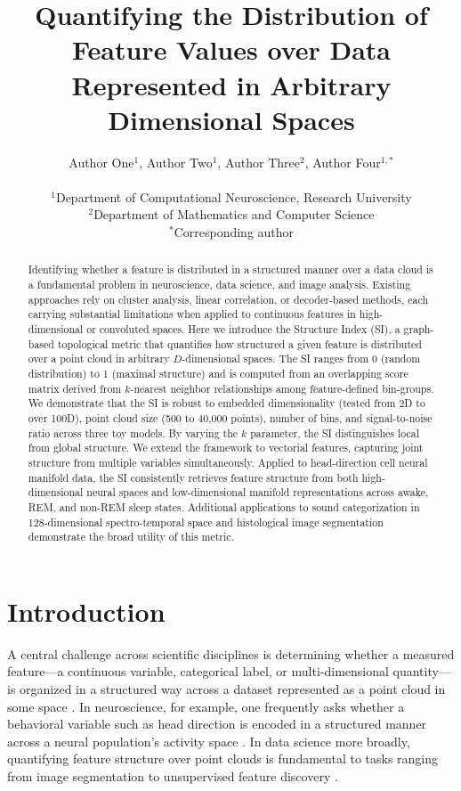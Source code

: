 \documentclass[12pt]{article}
\title{Quantifying the Distribution of Feature Values over Data Represented in Arbitrary Dimensional Spaces}
\author{Author One$^{1}$, Author Two$^{1}$, Author Three$^{2}$, Author Four$^{1,*}$\\
\\
\small $^{1}$Department of Computational Neuroscience, Research University\\
\small $^{2}$Department of Mathematics and Computer Science\\
\small $^{*}$Corresponding author}
\date{}
\begin{document}
\maketitle

\begin{abstract}
Identifying whether a feature is distributed in a structured manner over a data cloud is a fundamental problem in neuroscience, data science, and image analysis. Existing approaches rely on cluster analysis, linear correlation, or decoder-based methods, each carrying substantial limitations when applied to continuous features in high-dimensional or convoluted spaces. Here we introduce the Structure Index (SI), a graph-based topological metric that quantifies how structured a given feature is distributed over a point cloud in arbitrary $D$-dimensional spaces. The SI ranges from 0 (random distribution) to 1 (maximal structure) and is computed from an overlapping score matrix derived from $k$-nearest neighbor relationships among feature-defined bin-groups. We demonstrate that the SI is robust to embedded dimensionality (tested from 2D to over 100D), point cloud size (500 to 40,000 points), number of bins, and signal-to-noise ratio across three toy models. By varying the $k$ parameter, the SI distinguishes local from global structure. We extend the framework to vectorial features, capturing joint structure from multiple variables simultaneously. Applied to head-direction cell neural manifold data, the SI consistently retrieves feature structure from both high-dimensional neural spaces and low-dimensional manifold representations across awake, REM, and non-REM sleep states. Additional applications to sound categorization in 128-dimensional spectro-temporal space and histological image segmentation demonstrate the broad utility of this metric.
\end{abstract}

\section{Introduction}

A central challenge across scientific disciplines is determining whether a measured feature---a continuous variable, categorical label, or multi-dimensional quantity---is organized in a structured way across a dataset represented as a point cloud in some space \citep{cunningham2014dimensionality,jazayeri2021interpreting}. In neuroscience, for example, one frequently asks whether a behavioral variable such as head direction is encoded in a structured manner across a neural population's activity space \citep{chaudhuri2019intrinsic,gardner2022toroidal}. In data science more broadly, quantifying feature structure over point clouds is fundamental to tasks ranging from image segmentation to unsupervised feature discovery \citep{mcqueen2016nearly}.
\end{document}
